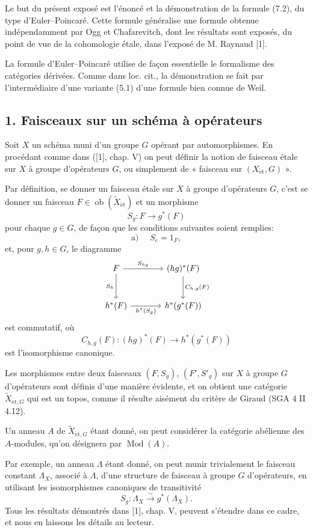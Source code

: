 \documentclass[11pt]{article}
\providecommand{\et}{\mathrm{\acute{e}t}}
\providecommand{\Ob}{\operatorname{ob}}
\providecommand{\Ob}{\operatorname{ob}}
\providecommand{\Ob}{\operatorname{Ob}}
\providecommand{\Mod}{\operatorname{Mod}}
\providecommand{\Ob}{\operatorname{ob}}
\begin{document}
Le but du présent exposé est l'énoncé et la démonstration de la formule (7.2), du type d'Euler--Poincaré. Cette formule généralise une formule obtenue indépendamment par Ogg et Chafarevitch, dont les résultats sont exposés, du point de vue de la cohomologie étale, dans l'exposé de M. Raynaud [1].

La formule d'Euler--Poincaré utilise de façon essentielle le formalisme des catégories dérivées. Comme dans loc. cit., la démonstration se fait par l'intermédiaire d'une variante (5.1) d'une formule bien connue de Weil.

\subsection*{1. Faisceaux sur un schéma à opérateurs}

Soit $X$ un schéma muni d'un groupe $G$ opérant par automorphismes. En procédant comme dans ([1], chap. V) on peut définir la notion de faisceau étale sur $X$ à groupe d'opérateurs $G$, ou simplement de « faisceau sur $(X_{\et},G)$ ».

Par définition, se donner un faisceau étale sur $X$ à groupe d'opérateurs $G$, c'est se donner un faisceau $F\in \Ob(\widetilde X_{\et})$ et un morphisme
\[
S_g:F\longrightarrow g^*(F)
\]
pour chaque $g\in G$, de façon que les conditions suivantes soient remplies:
\[
\text{a) }\quad S_e=1_F,
\]
et, pour $g,h\in G$, le diagramme
\[
\begin{tikzcd}[column sep=large,row sep=large]
F \arrow[r,"S_{hg}"] \arrow[d,"S_h"'] & (hg)^*(F) \arrow[d,"C_{h,g}(F)"]\\
h^*(F) \arrow[r,"h^*(S_g)"'] & h^*(g^*(F))
\end{tikzcd}
\]
est commutatif, où
\[
C_{h,g}(F):(hg)^*(F)\longrightarrow h^*(g^*(F))
\]
est l'isomorphisme canonique.

Les morphismes entre deux faisceaux $(F,S_g)$, $(F',S'_g)$ sur $X$ à groupe $G$ d'opérateurs sont définis d'une manière évidente, et on obtient une catégorie $\widetilde X_{\et,G}$ qui est un topos, comme il résulte aisément du critère de Giraud (SGA 4 II 4.12).

Un anneau $A$ de $\widetilde X_{\et,G}$ étant donné, on peut considérer la catégorie abélienne des $A$-modules, qu'on désignera par $\Mod(A)$.

Par exemple, un anneau $\Lambda$ étant donné, on peut munir trivialement le faisceau constant $\Lambda_X$, associé à $\Lambda$, d'une structure de faisceau à groupe $G$ d'opérateurs, en utilisant les isomorphismes canoniques de transitivité
\[
S_g:\Lambda_X\xrightarrow{\sim}g^*(\Lambda_X).
\]
Tous les résultats démontrés dans [1], chap. V, peuvent s'étendre dans ce cadre, et nous en laissons les détails au lecteur.
\end{document}
